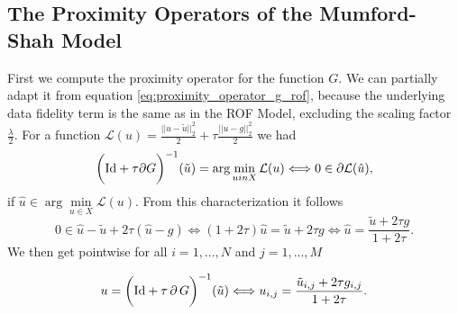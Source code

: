 

    \subsection{The Proximity Operators of the Mumford-Shah Model} %
    \label{sub:the_proximity_operators_of_the_mumford_shah_model}
        
        First we compute the proximity operator for the function $G$. We can partially adapt it from equation \ref{eq:proximity_operator_g_rof}, because the underlying data fidelity term is the same as in the ROF Model, excluding the scaling factor $\frac{\lambda}{2}$. For a function $\mathcal{L}(u) = \frac{||u - \tilde{u}||_{2}^{2}}{2} + \tau \frac{||u - g||_{2}^{2}}{2}$ we had
            $$
                \bigg( \textnormal{Id} + \tau \partial G \bigg)^{-1}(\tilde{u}) = \arg \min_{u in X} \mathcal{L}(u) \Longleftrightarrow 0 \in \partial \mathcal{L}(\hat{u}),
            $$
        if $\hat{u} \in \arg\min\limits_{u \in X} \mathcal{L}(u)$.
        From this characterization it follows
            $$
                0 \in \hat{u} - \tilde{u} + 2\tau (\hat{u} - g) \Longleftrightarrow (1 + 2\tau)\hat{u} = \tilde{u} + 2\tau g \Longleftrightarrow \hat{u} = \frac{\tilde{u} + 2\tau g}{1 + 2\tau}.
            $$
        We then get pointwise for all $i = 1, ..., N$ and $j = 1, ..., M$

            \begin{equation}
                u = \bigg( \textnormal{Id} + \tau\,\partial\,G \bigg)^{-1}(\tilde{u}) \Longleftrightarrow u_{i,j} = \frac{\tilde{u}_{i,j} + 2\tau g_{i,j}}{1 + 2\tau}.
            \label{eq:proximity_operator_G}
            \end{equation}


